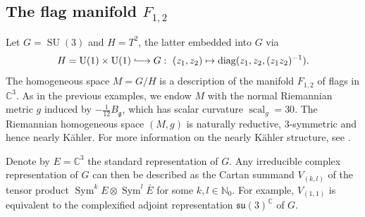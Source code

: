 \documentclass[12pt]{scrartcl}
\theoremstyle{plain}
\theoremstyle{definition}
\newcommand{\C}{\mathbb{C}}%
\newcommand{\N}{\mathbb{N}}%
\newcommand{\scal}{\operatorname{scal}}%
\newcommand{\Sym}{\operatorname{Sym}}%
\newcommand{\diag}{\operatorname{diag}}%
\newcommand{\U}{\operatorname{U}}%
\newcommand{\SU}{\operatorname{SU}}%
\newcommand{\su}{\mathfrak{su}}%
\newcommand{\g}{\mathfrak{g}}%
\newcommand{\hooklongrightarrow}{\lhook\joinrel\longrightarrow}%
\begin{document}
\subsection{The flag manifold $F_{1,2}$}
\label{sec:flag}

Let $G=\SU(3)$ and $H=T^2$, the latter embedded into $G$ via
\[H=\U(1)\times\U(1)\hooklongrightarrow G:\ (z_1,z_2)\mapsto\diag(z_1,z_2,(z_1z_2)^{-1}).\]
The homogeneous space $M=G/H$ is a description of the manifold $F_{1,2}$ of flags in $\C^3$. As in the previous examples, we endow $M$ with the normal Riemannian metric $g$ induced by $-\frac{1}{12}B_\g$, which has scalar curvature $\scal_g=30$. The Riemannian homogeneous space $(M,g)$ is naturally reductive, $3$-symmetric and hence nearly Kähler. For more information on the nearly Kähler structure, see \cite[Sec.~5.6]{hermitianlaplace}.

Denote by $E=\C^3$ the standard representation of $G$. Any irreducible complex representation of $G$ can then be described as the Cartan summand $V_{(k,l)}$ of the tensor product $\Sym^kE\otimes\Sym^l\bar E$ for some $k,l\in\N_0$. For example, $V_{(1,1)}$ is equivalent to the complexified adjoint representation $\su(3)^\C$ of $G$.
\end{document}
